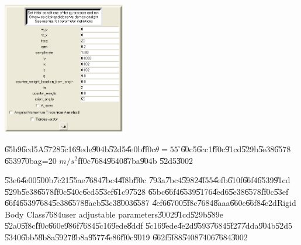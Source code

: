 \begin{center}
\includegraphics[width=0.4\textwidth]{./figs/parameter_1.png}
\end{center}%

\begin{case}
\U{65b9}\U{6cd5}A\U{5728}\U{5c16}\U{9ede}\U{904b}\U{52d5}\U{4e0b}\U{ff0c}$%
\theta =55^{\circ }$\U{60c5}\U{6cc1}\U{ff0c}\U{91cd}\U{529b}\U{5e38}\U{6578}%
\U{6539}\U{70ba}g=20 $m/s^{2}$\U{ff0c}\U{7684}\U{9640}\U{87ba}\U{904b}%
\U{52d5}\U{3002}
\end{case}

\U{53e6}\U{4e00}\U{500b}\U{7c21}\U{55ae}\U{7684}\U{7bc4}\U{4f8b}\U{ff0c}%
\U{793a}\U{7bc4}\U{5982}\U{4f55}\U{4efb}\U{610f}\U{66f4}\U{6539}\U{91cd}%
\U{529b}\U{5e38}\U{6578}\U{ff0c}\U{540c}\U{6cd5}\U{53ef}\U{61c9}\U{7528}%
\U{65bc}\U{66f4}\U{6539}\U{5176}\U{4ed6}\U{5e38}\U{6578}\U{ff0c}\U{53ef}%
\U{66f4}\U{6539}\U{7684}\U{5e38}\U{6578}\U{8acb}\U{53c3}\U{8003}\U{6587}%
\U{4ef6}\U{6700}\U{5f8c}\U{7684}\U{8aaa}\U{660e}\U{66f8}\U{4e2d}Rigid Body
Class\U{7684}user adjustable parameters\U{3002}\U{91cd}\U{529b}\U{589e}%
\U{52a0}\U{5f8c}\U{ff0c}\U{660e}\U{986f}\U{7684}\U{5c16}\U{9ede}\U{8ddf}%
\U{5c16}\U{9ede}\U{4e2d}\U{9593}\U{7684}\U{5f27}\U{7dda}\U{904b}\U{52d5}%
\U{5340}\U{6bb5}\U{8b8a}\U{5927}\U{8b8a}\U{9577}\U{4e86}\U{ff0c}\U{9019}%
\U{662f}\U{5f88}\U{5408}\U{7406}\U{7684}\U{3002}

%
\begin{center}

\end{center}%

